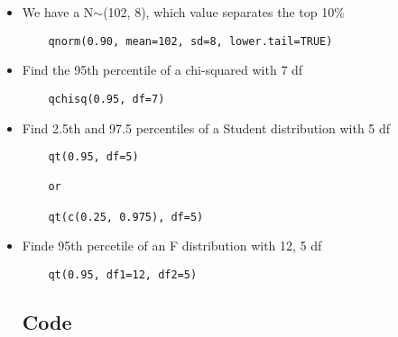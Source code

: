 \begin{itemize}
\item We have a N$\sim$(102, 8), which value separates the top 10\%

\begin{verbatim}
    qnorm(0.90, mean=102, sd=8, lower.tail=TRUE) 
\end{verbatim}

\item Find the 95th percentile of a chi-squared with 7 df

\begin{verbatim}
    qchisq(0.95, df=7)
\end{verbatim}

\item Find 2.5th and 97.5 percentiles of a Student distribution with 5 df

\begin{verbatim}
    qt(0.95, df=5)

    or

    qt(c(0.25, 0.975), df=5)
\end{verbatim}

\item Finde 95th percetile of an F distribution with 12, 5 df

\begin{verbatim}
    qt(0.95, df1=12, df2=5)
\end{verbatim}




\subsection{Code}
    
\end{itemize}
